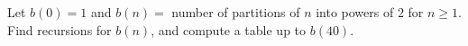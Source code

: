 Let $b(0) = 1$ and $b(n) =$ number of partitions of $n$ into powers of $2$ for $n \geq 1$. Find recursions for $b(n)$, and compute a table up to $b(40)$.
